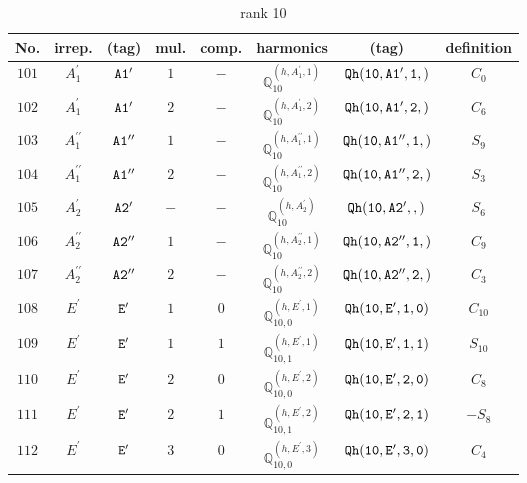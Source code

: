 \documentclass[fleqn,8pt]{jsarticle}
\begin{document}
\begin{table}[ht!]
\begin{center}
\caption{rank 10}
\renewcommand{\arraystretch}{1.3}
\begin{tabular}{cccccccc} \hline \hline
No. & irrep. & (tag) & mul. & comp. & harmonics & (tag) & definition \\ \hline
$ 101 $ & $ A_{1}^{\prime} $ & $ {\tt A1'} $ & $ 1 $ & $ - $ & $ \mathbb{Q}_{10}^{(h,A_{1}^{\prime},1)} $ & $ {\tt Qh(10,A1',1,)} $ & $ C_{0} $ \\
$ 102 $ & $ A_{1}^{\prime} $ & $ {\tt A1'} $ & $ 2 $ & $ - $ & $ \mathbb{Q}_{10}^{(h,A_{1}^{\prime},2)} $ & $ {\tt Qh(10,A1',2,)} $ & $ C_{6} $ \\
$ 103 $ & $ A_{1}^{\prime\prime} $ & $ {\tt A1''} $ & $ 1 $ & $ - $ & $ \mathbb{Q}_{10}^{(h,A_{1}^{\prime\prime},1)} $ & $ {\tt Qh(10,A1'',1,)} $ & $ S_{9} $ \\
$ 104 $ & $ A_{1}^{\prime\prime} $ & $ {\tt A1''} $ & $ 2 $ & $ - $ & $ \mathbb{Q}_{10}^{(h,A_{1}^{\prime\prime},2)} $ & $ {\tt Qh(10,A1'',2,)} $ & $ S_{3} $ \\
$ 105 $ & $ A_{2}^{\prime} $ & $ {\tt A2'} $ & $ - $ & $ - $ & $ \mathbb{Q}_{10}^{(h,A_{2}^{\prime})} $ & $ {\tt Qh(10,A2',,)} $ & $ S_{6} $ \\
$ 106 $ & $ A_{2}^{\prime\prime} $ & $ {\tt A2''} $ & $ 1 $ & $ - $ & $ \mathbb{Q}_{10}^{(h,A_{2}^{\prime\prime},1)} $ & $ {\tt Qh(10,A2'',1,)} $ & $ C_{9} $ \\
$ 107 $ & $ A_{2}^{\prime\prime} $ & $ {\tt A2''} $ & $ 2 $ & $ - $ & $ \mathbb{Q}_{10}^{(h,A_{2}^{\prime\prime},2)} $ & $ {\tt Qh(10,A2'',2,)} $ & $ C_{3} $ \\
$ 108 $ & $ E^{\prime} $ & $ {\tt E'} $ & $ 1 $ & $ 0 $ & $ \mathbb{Q}_{10,0}^{(h,E^{\prime},1)} $ & $ {\tt Qh(10,E',1,0)} $ & $ C_{10} $ \\
$ 109 $ & $ E^{\prime} $ & $ {\tt E'} $ & $ 1 $ & $ 1 $ & $ \mathbb{Q}_{10,1}^{(h,E^{\prime},1)} $ & $ {\tt Qh(10,E',1,1)} $ & $ S_{10} $ \\
$ 110 $ & $ E^{\prime} $ & $ {\tt E'} $ & $ 2 $ & $ 0 $ & $ \mathbb{Q}_{10,0}^{(h,E^{\prime},2)} $ & $ {\tt Qh(10,E',2,0)} $ & $ C_{8} $ \\
$ 111 $ & $ E^{\prime} $ & $ {\tt E'} $ & $ 2 $ & $ 1 $ & $ \mathbb{Q}_{10,1}^{(h,E^{\prime},2)} $ & $ {\tt Qh(10,E',2,1)} $ & $ - S_{8} $ \\
$ 112 $ & $ E^{\prime} $ & $ {\tt E'} $ & $ 3 $ & $ 0 $ & $ \mathbb{Q}_{10,0}^{(h,E^{\prime},3)} $ & $ {\tt Qh(10,E',3,0)} $ & $ C_{4} $ \\

\end{tabular}
\end{center}
\end{table}
\end{document}
